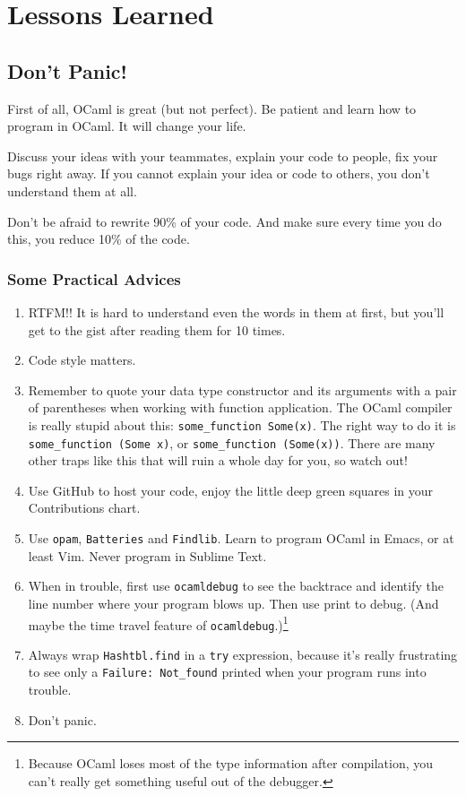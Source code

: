 \documentclass{report}
\begin{document}
\chapter{Lessons Learned}

\section{Don't Panic!}

First of all, OCaml is great (but not perfect). Be patient and learn how to program in OCaml. It will change your life.

Discuss your ideas with your teammates, explain your code to people, fix your bugs right away. If you cannot explain your idea or code to others, you don't understand them at all.

Don't be afraid to rewrite 90\% of your code. And make sure every time you do this, you reduce 10\% of the code.

\subsection{Some Practical Advices}
\begin{enumerate}
\item RTFM!! It is hard to understand even the words in them at first, but you'll get to the gist after reading them for 10 times.

\item Code style matters.

\item Remember to quote your data type constructor and its arguments with a pair of parentheses when working with function application. The OCaml compiler is really stupid about this: \texttt{some\_function Some(x)}. The right way to do it is \texttt{some\_function (Some x)}, or \texttt{some\_function (Some(x))}. There are many other traps like this that will ruin a whole day for you, so watch out!

\item Use GitHub to host your code, enjoy the little deep green squares in your Contributions chart.

\item Use \texttt{opam}, \texttt{Batteries} and \texttt{Findlib}. Learn to program OCaml in Emacs, or at least Vim. Never program in Sublime Text.

\item When in trouble, first use \texttt{ocamldebug} to see the backtrace and identify the line number where your program blows up. Then use print to debug. (And maybe the time travel feature of \texttt{ocamldebug}.)\footnote{Because OCaml loses most of the type information after compilation, you can't really get something useful out of the debugger.}

\item Always wrap \texttt{Hashtbl.find} in a \texttt{try} expression, because it's really frustrating to see only a \texttt{Failure: Not\_found} printed when your program runs into trouble.

\item Don't panic.
\end{enumerate}
\end{document}

